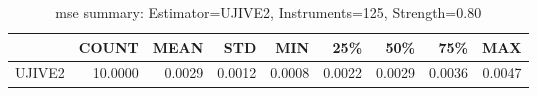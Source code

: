 \begin{table}[ht]
\centering
\caption{mse summary: Estimator=UJIVE2, Instruments=125, Strength=0.80}
\begin{tabular}{lrrrrrrrr}
\toprule
 & COUNT & MEAN & STD & MIN & 25\% & 50\% & 75\% & MAX \\
\midrule
UJIVE2 & 10.0000 & 0.0029 & 0.0012 & 0.0008 & 0.0022 & 0.0029 & 0.0036 & 0.0047 \\
\bottomrule
\end{tabular}
\end{table}
